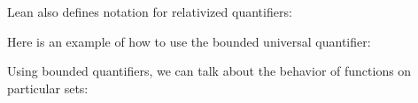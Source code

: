 \documentclass[letterpaper,10pt,english]{sphinxmanual}
\begin{document}
\sphinxAtStartPar
Lean also defines notation for relativized quantifiers:

\begin{sphinxVerbatim}[commandchars=\\\{\}]
            

      
      
\end{sphinxVerbatim}

\sphinxAtStartPar
Here is an example of how to use the bounded universal quantifier:

\begin{sphinxVerbatim}[commandchars=\\\{\}]
                       
\end{sphinxVerbatim}

\sphinxAtStartPar
Using bounded quantifiers, we can talk about the behavior of functions on particular sets:
\end{document}
